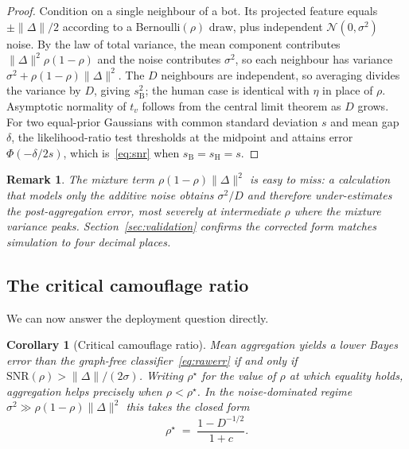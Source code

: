 \documentclass[onecolumn,pdflatex,sn-basic,Numbered]{sn-jnl}
\theoremstyle{thmstyleone}
\newtheorem{corollary}[theorem]{Corollary}
\theoremstyle{thmstylethree}
\newtheorem{remark}[theorem]{Remark}
\begin{document}
\begin{proof}
Condition on a single neighbour of a bot. Its projected feature equals
$\pm\|\Delta\|/2$ according to a Bernoulli$(\rho)$ draw, plus independent
$\mathcal{N}(0,\sigma^2)$ noise. By the law of total variance, the mean component
contributes $\|\Delta\|^2\rho(1-\rho)$ and the noise contributes $\sigma^2$, so each
neighbour has variance $\sigma^2 + \rho(1-\rho)\|\Delta\|^2$. The $D$ neighbours are
independent, so averaging divides the variance by $D$, giving $s_{\mathrm{B}}^2$;
the human case is identical with $\eta$ in place of $\rho$. Asymptotic normality of
$t_v$ follows from the central limit theorem as $D$ grows. For two equal-prior
Gaussians with common standard deviation $s$ and mean gap $\delta$, the
likelihood-ratio test thresholds at the midpoint and attains error
$\Phi(-\delta/2s)$, which is~\eqref{eq:snr} when $s_{\mathrm{B}} = s_{\mathrm{H}} = s$.
\end{proof}

\begin{remark}
The mixture term $\rho(1-\rho)\|\Delta\|^2$ is easy to miss: a calculation that
models only the additive noise obtains $\sigma^2/D$ and therefore
\emph{under}-estimates the post-aggregation error, most severely at intermediate
$\rho$ where the mixture variance peaks. Section~\ref{sec:validation} confirms
the corrected form matches simulation to four decimal places.
\end{remark}

\subsection{The critical camouflage ratio}

We can now answer the deployment question directly.

\begin{corollary}[Critical camouflage ratio]
\label{cor:critical}
Mean aggregation yields a lower Bayes error than the graph-free
classifier~\eqref{eq:rawerr} if and only if $\mathrm{SNR}(\rho) > \|\Delta\|/(2\sigma)$.
Writing $\rho^\star$ for the value of $\rho$ at which equality holds, aggregation
helps precisely when $\rho < \rho^\star$. In the noise-dominated regime
$\sigma^2 \gg \rho(1-\rho)\|\Delta\|^2$ this takes the closed form
\begin{equation}
    \rho^\star \;=\; \frac{1 - D^{-1/2}}{1+c}.
    \label{eq:critical}
\end{equation}
\end{corollary}
\end{document}

